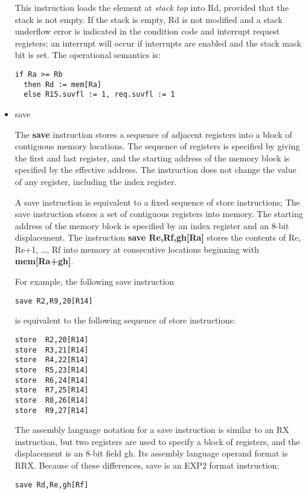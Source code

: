 \documentclass[11pt]{article}
\begin{document}
\begin{itemize}
This instruction loads the element at \emph{stack top} into Rd, provided
that the stack is not empty.  If the stack is empty, Rd is not
modified and a stack underflow error is indicated in the condition
code and interrupt request registers; an interrupt will occur if
interrupts are enabled and the stack mask bit is set.  The operational
semantics is:

\begin{verbatim}
if Ra >= Rb
  then Rd := mem[Ra]
  else R15.suvfl := 1, req.suvfl := 1
\end{verbatim}

\item save
\label{sec:orgf075023}

The \textbf{save} instruction stores a sequence of adjacent registers into a
block of contiguous memory locations.  The sequence of registers is
specified by giving the first and last register, and the starting
address of the memory block is specified by the effective address.
The instruction does not change the value of any register, including
the index register.

A save instruction is equivalent to a fixed sequence of store
instructions; The save instruction stores a set of contiguous
registers into memory.  The starting address of the memory block is
specified by an index register and an 8-bit displacement.  The
instruction \textbf{save Re,Rf,gh[Ra]} stores the contents of Re, Re+1, \ldots{},
Rf into memory at consecutive locations beginning with \textbf{mem[Ra+gh]}.

For example, the following save instruction

\begin{verbatim}
save R2,R9,20[R14]
\end{verbatim}

is equivalent to the following sequence of store instructions:

\begin{verbatim}
store  R2,20[R14]
store  R3,21[R14]
store  R4,22[R14]
store  R5,23[R14]
store  R6,24[R14]
store  R7,25[R14]
store  R8,26[R14]
store  R9,27[R14]
\end{verbatim}

The assembly language notation for a save instruction is similar to an
RX instruction, but two registers are used to specify a block of
registers, and the displacement is an 8-bit field gh. Its assembly
language operand format is RRX.  Because of these differences, save is
an EXP2 format instruction:

\begin{verbatim}
save Rd,Re,gh[Rf]
\end{verbatim}


\end{itemize}
\end{document}
